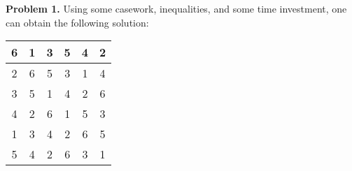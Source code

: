 \begin{solution}{1}
    \textbf{Problem 1.} Using some casework, inequalities, and some time investment, one can obtain the following solution:

    {
    \Large
    \begin{center}
    \begin{tabular}{|c|c|c|c|c|c|}
        \hline
        6 & 1 & 3 & 5 & 4 & 2 \\
        \hline
        2 & 6 & 5 & 3 & 1 & 4 \\
        \hline
        3 & 5 & 1 & 4 & 2 & 6 \\
        \hline
        4 & 2 & 6 & 1 & 5 & 3 \\
        \hline
        1 & 3 & 4 & 2 & 6 & 5 \\
        \hline
        5 & 4 & 2 & 6 & 3 & 1 \\
        \hline
    \end{tabular}
    \end{center}
    }
\end{solution}
